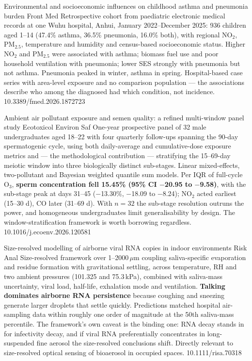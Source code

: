 \documentclass[10pt]{article}
\begin{document}

{Environmental and socioeconomic influences on childhood asthma and pneumonia burden}
{Front Med}
{Retrospective cohort from paediatric electronic medical records at one Wuhu hospital,
Anhui, January 2022--December 2025: 936 children aged 1--14 (47.4\% asthma, 36.5\%
pneumonia, 16.0\% both), with regional NO$_2$, PM$_{2.5}$, temperature and humidity and
census-based socioeconomic status. Higher NO$_2$ and PM$_{2.5}$ were associated with
asthma; biomass fuel use and poor household ventilation with pneumonia; lower SES
strongly with pneumonia but not asthma. Pneumonia peaked in winter, asthma in spring.
Hospital-based case series with area-level exposure and no comparison population --- the
associations describe who among the diagnosed had which condition, not incidence.}
{10.3389/fmed.2026.1872723}


{Ambient air pollutant exposure and semen quality: a refined multi-window panel study}
{Ecotoxicol Environ Saf}
{One-year prospective panel of 32 male undergraduates aged 18--22 with four quarterly
follow-ups spanning the 90-day spermatogenic cycle, using both daily-average and
cumulative-dose exposure metrics and --- the methodological contribution --- stratifying
the 15--69-day meiotic window into three biologically distinct sub-stages. Linear
mixed-effects, two-pollutant and Bayesian weighted quantile sum models. Per IQR of
full-cycle O$_3$, \textbf{sperm concentration fell 15.45\% (95\% CI $-$20.95 to
$-$9.58)}, with the sub-stage peak at days 31--45 ($-$13.30\%, $-$18.09 to $-$8.24);
NO$_2$ acted earliest (15--30 d), CO later (31--69 d). With $n=32$ the sub-stage
resolution outruns the power, and homogeneous undergraduates limit generalisability by
design. The window-stratification framework is worth borrowing regardless.}
{10.1016/j.ecoenv.2026.120581}


{Size-resolved modelling of airborne viral RNA copies in indoor environments}
{Risk Anal}
{Size-resolved framework over 1--2000\,$\mu$m coupling saliva-specific evaporation and
residue formation with gravitational settling, across temperature, RH and two ambient
pressures (101.325 and 75.3\,kPa), combined with saliva-mass uncertainty, viral load,
half-life, exhalation mode and ventilation. \textbf{Talking dominates airborne RNA
persistence} because coughing and sneezing generate larger droplets that settle quickly.
Predictions matched hospital air-sampling data within roughly one order of magnitude at
the 50th saliva-mass percentile. The framework's own caveat is the binding one: RNA decay
stands in for infectivity decay, and if viral RNA preferentially concentrates in
long-suspended fine aerosol the size-resolved conclusions shift. Directly relevant to
size-resolved optical sensing of bioaerosol in occupied spaces.}
{10.1111/risa.70318}
\end{document}
